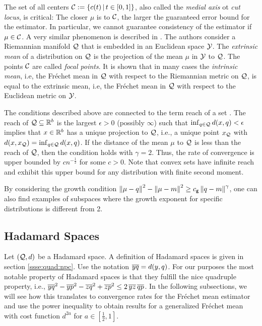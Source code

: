 	The set of all centers $\mathcal{C} := \left\lbrace c(t) \,|\, t \in [0,1] \right\rbrace$, also called the \textit{medial axis} ot \textit{cut locus}, is critical: The closer $\mu$ is to $\mathcal{C}$, the larger the guaranteed error bound for the estimator. In particular, we cannot guarantee consistency of  the estimator if $\mu \in \mathcal{C}$. A very similar phenomenon is described in \cite[section 3]{bhattacharya03}. The authors consider a Riemannian manifold $\mathcal{Q}$ that is embedded in an Euclidean space $\mathcal{Y}$. The \textit{extrinsic mean} of a distribution on $\mathcal{Q}$ is the projection of the mean $\mu$ in $\mathcal{Y}$ to $\mathcal{Q}$. The points $\mathcal{C}$ are called \textit{focal points}. It is shown \cite[Theorem 3.3]{bhattacharya03} that in many cases the \textit{intrinsic mean}, i.e, the Fréchet mean in $\mathcal{Q}$ with respect to the Riemannian metric on $\mathcal{Q}$, is equal to the extrinsic mean, i.e, the Fréchet mean in $\mathcal{Q}$ with respect to the Euclidean metric on $\mathcal{Y}$.
	
	The conditions described above are connected to the term reach of a set \cite{federer59}. The reach of $\mathcal{Q} \subseteq \mathbb{R}^b$ is the largest $\epsilon>0$ (possibly $\infty$) such that $\inf_{q\in\mathcal{Q}} d(x, q) < \epsilon$ implies that $x \in \mathbb{R}^b$ has a unique projection to $\mathcal{Q}$, i.e., a unique point $x_{\mathcal{Q}}$ with $d(x, x_{\mathcal{Q}}) = \inf_{q\in\mathcal{Q}} d(x, q)$. If the distance of the mean $\mu$ to $\mathcal{Q}$ is less than the reach of $\mathcal{Q}$, then the  condition holds with $\gamma = 2$. Thus, the rate of convergence is upper bounded by $c n^{-\frac12}$ for some $c>0$. Note that convex sets have infinite reach and exhibit this upper bound for any distribution with finite second moment.

	By considering the growth condition $\left\Vert \mu-q \right\Vert^2-\left\Vert \mu-m \right\Vert^2 \geq c_{\mathsf{g}}\left\Vert q-m \right\Vert^\gamma$, one can also find examples of subspaces where the growth exponent for specific distributions is different from 2.
%
%
%
%
\subsection{Hadamard Spaces}\label{ssec:app:hadamard}
%
%
Let $(\mathcal{Q}, d)$ be a Hadamard space. A definition of Hadamard spaces is given in section \ref{ssse:quad:npc}. Use the notation $\overline{yq} = d(y,q)$. For our purposes the most notable property of Hadamard spaces is that they fulfill the nice quadruple property, i.e., $\overline{yq}^2 - \overline{yp}^2 - \overline{zq}^2 + \overline{zp}^2 \leq 2 \,\overline{yz}\, \overline{qp}$. In the following subsections, we will see how this translates to convergence rates for the Fréchet mean estimator and use the power inequality to obtain results for a generalized Fréchet mean with cost function $d^{2a}$ for $a\in[\frac12, 1]$.

